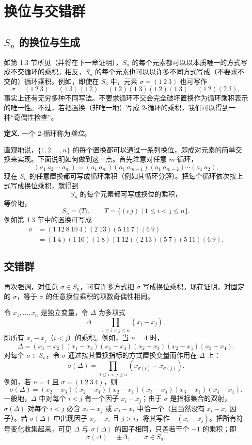 \section{换位与交错群}

\subsection*{$S_n$ 的换位与生成}

如第 1.3 节所见（并将在下一章证明），$S_n$ 的每个元素都可以以本质唯一的方式写成不交循环的乘积。相反，$S_n$ 的每个元素也可以以许多不同方式写成（不要求不交的）循环乘积。例如，即使在 $S_3$ 中，元素 $\sigma=(1\ 2\ 3)$ 也可写作
\[
  \sigma=(1\ 2\ 3)=(1\ 3)(1\ 2)=(1\ 2)(1\ 3)(1\ 2)(1\ 3)=(1\ 2)(2\ 3),
\]
事实上还有无穷多种不同写法。不要求循环不交会完全破坏置换作为循环乘积表示的唯一性。不过，若把置换（非唯一地）写成 $2$-循环的乘积，我们可以得到一种“奇偶性检查”。

\noindent\textbf{定义.} 一个 $2$-循环称为\emph{换位}。

直观地说，$\{1,2,
\ldots,n\}$ 的每个置换都可以通过一系列换位，即成对元素的简单交换来实现。下面说明如何做到这一点。首先注意对任意 $m$-循环，
\[
  (a_1\ a_2\ \cdots\ a_m)
  =(a_1\ a_m)(a_1\ a_{m-1})(a_1\ a_{m-2})\cdots(a_1\ a_2).
\]
现在 $S_n$ 的任意置换都可写成循环乘积（例如其循环分解）。把每个循环依次按上式写成换位乘积，就得到
\[
  \text{$S_n$ 的每个元素都可写成换位的乘积，}
\]
等价地，
\[
  S_n=\langle T\rangle,
  \qquad T=\{(i\ j)
  \mid 1\leq i<j\leq n\}.
\]
例如第 1.3 节中的置换可写成
\begin{align*}
  \sigma&=(1\ 12\ 8\ 10\ 4)(2\ 13)(5\ 11\ 7)(6\ 9)\\
  &=(1\ 4)(1\ 10)(1\ 8)(1\ 12)(2\ 13)(5\ 7)(5\ 11)(6\ 9).
\end{align*}

\subsection*{交错群}

再次强调，对任意 $\sigma\in S_n$，可有许多方式把 $\sigma$ 写成换位乘积。现在证明，对固定的 $\sigma$，等于 $\sigma$ 的任意换位乘积的项数奇偶性相同。

令 $x_1,
\ldots,x_n$ 是独立变量，令 $\Delta$ 为多项式
\[
  \Delta=\prod_{1\leq i<j\leq n}(x_i-x_j),
\]
即所有 $x_i-x_j$（$i<j$）的乘积。例如，当 $n=4$ 时，
\[
  \Delta=(x_1-x_2)(x_1-x_3)(x_1-x_4)(x_2-x_3)(x_2-x_4)(x_3-x_4).
\]
对每个 $\sigma\in S_n$，令 $\sigma$ 通过按其置换指标的方式置换变量而作用在 $\Delta$ 上：
\[
  \sigma(\Delta)=\prod_{1\leq i<j\leq n}(x_{\sigma(i)}-x_{\sigma(j)}).
\]
例如，若 $n=4$ 且 $\sigma=(1\ 2\ 3\ 4)$，则
\[
  \sigma(\Delta)=(x_2-x_3)(x_2-x_4)(x_2-x_1)(x_3-x_4)(x_3-x_1)(x_4-x_1).
\]
一般地，$\Delta$ 中对每个 $i<j$ 有一个因子 $x_i-x_j$；由于 $\sigma$ 是指标集合的双射，$\sigma(\Delta)$ 对每个 $i<j$ 必含 $x_i-x_j$ 或 $x_j-x_i$ 中恰一个（且当然没有 $x_i-x_i$ 因子）。若 $\sigma(\Delta)$ 中出现因子 $x_j-x_i$ 且 $j>i$，将其写作 $-(x_i-x_j)$。把所有符号变化收集起来，可见 $\Delta$ 与 $\sigma(\Delta)$ 的因子相同，只差若干个 $-1$ 的乘积；即
\[
  \sigma(\Delta)=\pm\Delta,
  \qquad \sigma\in S_n.
\]

